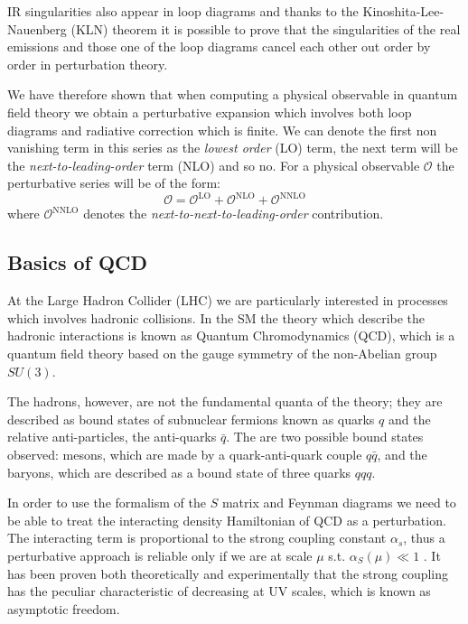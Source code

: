 \documentclass[../main/main.tex]{subfiles}
\begin{document}
IR singularities also appear in loop diagrams and thanks to the Kinoshita-Lee-Nauenberg (KLN) theorem it is possible to prove that the singularities of the real emissions and those one of the loop diagrams cancel each other out  order by order in perturbation theory.

We have therefore shown that when computing a physical observable in quantum field theory we obtain a perturbative expansion which 
involves both loop diagrams and radiative correction which is finite. We can denote the first non vanishing term in this series as the 
\emph{lowest order} (LO) term, the next term will be the \emph{next-to-leading-order} term (NLO) and so no.
For a physical observable $\mathcal{O}$ the perturbative series will be of the form:
\begin{equation}
	\mathcal{O} = \mathcal{O}^{\text{LO}}+\mathcal{O}^{\text{NLO}}+ \mathcal{O}^{\text{NNLO}}
\end{equation}
	where $ \mathcal{O}^{\text{NNLO}}$ denotes the \emph{next-to-next-to-leading-order }contribution.

\subsection{Basics of QCD}
At the Large Hadron Collider (LHC) we are particularly interested in processes which involves hadronic collisions. In the SM the theory which describe the hadronic interactions is known as Quantum 
Chromodynamics (QCD), which is a quantum field theory based on the gauge symmetry of the non-Abelian group $SU(3)$.

The hadrons, however, are not the fundamental quanta of the theory; they are described as bound states of subnuclear fermions known as quarks $q$ and the relative anti-particles, the anti-quarks $\bar{q}$. The 
are two possible bound states observed: mesons, which are made by a quark-anti-quark couple $q\bar{q}$, 
and the baryons, which are described as a bound state of three quarks $qqq$. 

In order to use the formalism of the $S$ matrix and Feynman diagrams we need to be able to treat the interacting density Hamiltonian of QCD as 
a perturbation. The interacting term is proportional to the strong coupling constant $\alpha_s$, thus a perturbative approach is reliable only 
if we are at scale $\mu $ s.t. $\alpha_S(\mu)  \ll 1$ . It has been proven both theoretically and experimentally that the strong coupling has the peculiar characteristic of decreasing at UV scales, which is known as asymptotic freedom.
\end{document}
